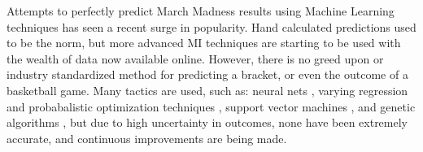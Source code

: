 \documentclass[conference]{IEEEtran}
\begin{document}
Attempts to perfectly predict March Madness results using Machine Learning techniques has seen a recent surge in popularity. 
Hand calculated predictions used to be the norm, but more advanced MI techniques are starting to be used with the wealth of data now available online. 
However, there is no greed upon or industry standardized method for predicting a bracket, or even the outcome of a basketball game. 
Many tactics are used, such as: neural nets \cite{KarlLeswing}, varying regression and probabalistic optimization techniques \cite{adams-dahl-murray-2010a, DannyTarlow, BradyWest, BradleyCarlin, ProbModelsNCAA-1991, MoreProbModelsNCAA-1996}, support vector machines \cite{KennethDeakins}, and genetic algorithms \cite{ScottTurner}, but due to high uncertainty in outcomes, none have been extremely accurate, and continuous improvements are being made.
\end{document}
